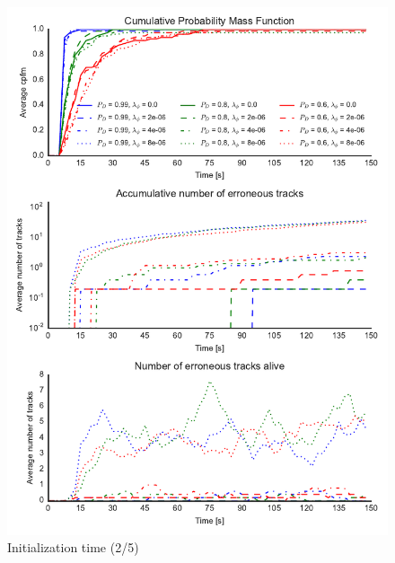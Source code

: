 \begin{figure}
\centering
\includegraphics{Figures/plots/Scenario0_Init-Time(2-5).pdf}
\caption{Initialization time (2/5)}\label{fig:init_time_2-5}
\end{figure}

